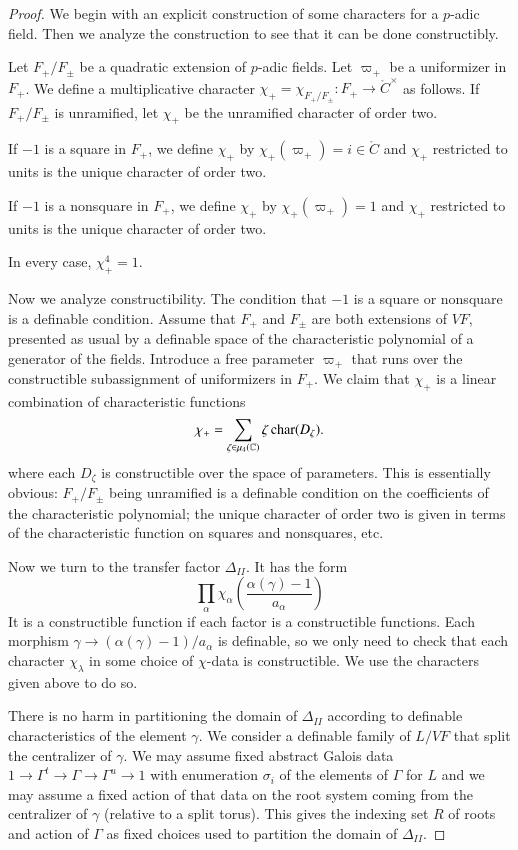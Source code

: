 \begin{proof}  We begin with an explicit construction of some characters for a $p$-adic field.  Then we analyze the construction to
see that it can be done constructibly.

Let $F_+/F_\pm$ be a quadratic extension of $p$-adic fields.  Let $\varpi_+$ be a uniformizer in $F_+$.  We define a multiplicative character $\chi_+ = \chi_{F_+/F_{\pm}}:F_+\to \ring{C}^\times$
as follows.  If $F_+/F_\pm$ is unramified, let $\chi_+$ be the unramified character of order two.

If $-1$ is a square in $F_+$, we define $\chi_+$ by $\chi_+(\varpi_+) = i\in\ring{C}$ and $\chi_+$ restricted to units is the unique character of order two.

If $-1$ is a nonsquare in $F_+$, we define $\chi_+$ by $\chi_+(\varpi_+)=1$ and $\chi_+$ restricted to units is the unique character of order two.

In every case, $\chi_+^4 = 1$.  

Now we analyze  constructibility.  The condition that $-1$ is a square or nonsquare is a definable condition.
Assume that $F_+$ and $F_\pm$ are both extensions of $VF$, presented as usual by a definable space of the characteristic polynomial of a generator of the fields.  
Introduce a free parameter $\varpi_+$ that runs over the constructible subassignment of uniformizers in $F_+$.
We claim that $\chi_+$ is a linear combination of characteristic functions
\[
\chi_+ = \sum_{\zeta\in\mu_4(\mathbb{C})} \zeta\, {\operatorname{char}}(D_\zeta).
\]
where each $D_\zeta$ is constructible over the space of parameters.  
This is essentially obvious: $F_+/F_\pm$ being unramified is a definable condition on the coefficients of the characteristic polynomial;
the unique character of order two is given in terms of the characteristic function  on squares and nonsquares, etc.

Now we turn to the transfer factor $\Delta_{II}$.  It has the form
\[
\prod_\alpha \chi_\alpha\left(\frac{\alpha(\gamma)-1}{a_\alpha}\right)
\]
It is a constructible function if each factor is a constructible functions. Each morphism $\gamma\to(\alpha(\gamma)-1)/a_\alpha$ is
definable, so we only need to check that each character $\chi_\lambda$ in some choice of $\chi$-data is constructible.  We use the characters
given above to do so.

There is no harm in partitioning the domain of $\Delta_{II}$   according to definable characteristics of the element $\gamma$.  We consider a definable family of
 $L/VF$ that split the centralizer of $\gamma$.  We may assume fixed abstract Galois data $1\to\Gamma^t\to\Gamma\to \Gamma^u\to 1$ with
enumeration $\sigma_i$ of the elements of $\Gamma$ for $L$
and we may assume a fixed action of that data on the root system coming from the centralizer of $\gamma$ (relative to a split torus).   This gives the
indexing set $R$ of roots and action of $\Gamma$ as fixed choices used to partition the domain of $\Delta_{II}$.


\end{proof}
